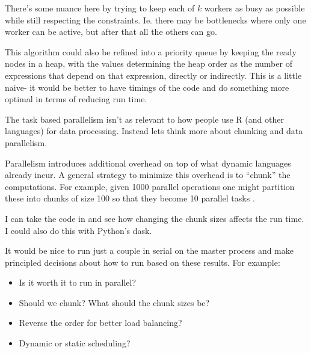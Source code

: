 \documentclass[12pt]{article}
\begin{document}
There's some nuance here by trying to keep each of $k$ workers as busy as
possible while still respecting the constraints. Ie. there may be
bottlenecks where only one worker can be active, but after that all the
others can go.

This algorithm could also be refined into a priority queue by keeping the ready
nodes in a heap, with the values determining the heap order as the number
of expressions that depend on that expression, directly or indirectly. This
is a little naive- it would be better to have timings of the code and do
something more optimal in terms of reducing run time.

\newpage
\newpage


The task based parallelism isn't as relevant to how people use R (and other
languages) for data processing. Instead
lets think more about chunking and data parallelism. 

Parallelism introduces additional overhead on top of what dynamic languages
already incur. A general strategy to minimize this overhead is to ``chunk''
the computations. For example, given 1000 parallel operations one might
partition these into chunks of size 100 so that they become 10 parallel
tasks \cite{matloff2015parallel}.

I can take the code in \cite{matloff2015parallel} and see how changing the
chunk sizes affects the run time. I could also do this with Python's dask.

It would be nice to run just a couple in serial on the master process and
make principled decisions about how to run based on these results. For
example:
\begin{itemize}
    \item Is it worth it to run in parallel?
    \item Should we chunk? What should the chunk sizes be?
    \item Reverse the order for better load balancing?
    \item Dynamic or static scheduling?
\end{itemize}


 
\end{document}

